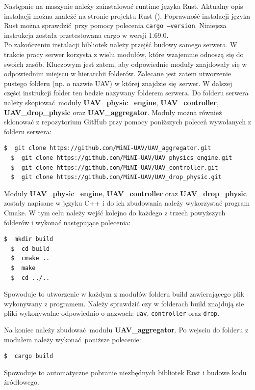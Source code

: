 \documentclass[15pt]{sprawozdanie}
\begin{document}
Następnie na maszynie należy zainstalować runtime języka Rust. Aktualny opis instalacji można znaleźć na stronie projektu Rust (\cite{rust_getting_started}). Poprawność instalacji języka Rust można sprawdzić przy pomocy polecenia \texttt{cargo --version}. Niniejsza instrukcja została przetestowana cargo w wersji 1.69.0.\\
 
Po zakończeniu instalacji bibliotek należy przejść budowy samego serwera. W trakcie pracy serwer korzysta z wielu modułów, które wzajemnie odnoszą się do swoich zasób. Kluczowym jest zatem, aby odpowiednie moduły znajdowały się w odpowiednim miejscu w hierarchii folderów. Zalecane jest zatem utworzenie pustego folderu (np. o nazwie UAV) w której znajdzie się serwer. W dalszej części instrukcji folder ten bedzie nazywany folderem serwera. Do folderu serwera należy skopiować moduły \textbf{UAV\_physic\_engine}, \textbf{UAV\_controller}, \textbf{UAV\_drop\_physic} oraz \textbf{UAV\_aggregator}. Moduły można również sklonować z repozytorium GitHub przy pomocy poniższych poleceń wywołanych z folderu serwera:
\begin{lstlisting}[language=bash]
  $  git clone https://github.com/MiNI-UAV/UAV_aggregator.git 
  $  git clone https://github.com/MiNI-UAV/UAV_physics_engine.git
  $  git clone https://github.com/MiNI-UAV/UAV_controller.git
  $  git clone https://github.com/MiNI-UAV/UAV_drop_physic.git
\end{lstlisting}

Moduły \textbf{UAV\_physic\_engine}, \textbf{UAV\_controller} oraz \textbf{UAV\_drop\_physic} zostały napisane w języku C++ i do ich zbudowania należy wykorzystać program Cmake. W tym celu należy wejść kolejno do każdego z trzech powyższych folderów i wykonać następujące polecenia:
\begin{lstlisting}[language=bash]
  $  mkdir build
  $  cd build
  $  cmake ..
  $  make
  $  cd ../..
\end{lstlisting}
Spowoduje to utworzenie w każdym z modułów folderu build zawierającego plik wykonywany z programem. Należy sprawdzić czy w folderach build znajdują sie pliki wykonywalne odpowiednio o nazwach: \texttt{uav}, \texttt{controller} oraz \texttt{drop}.

Na koniec należy zbudować modułu \textbf{UAV\_aggregator}. Po wejsciu do folderu z modułem należy wykonać poniższe polecenie:
\begin{lstlisting}[language=bash]
  $  cargo build
\end{lstlisting}
Spowoduje to automatyczne pobranie niezbędnych bibliotek Rust i budowe kodu źródłowego.\\
\end{document}
